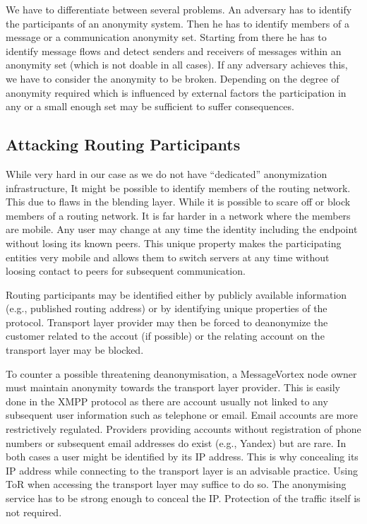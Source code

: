 We have to differentiate between several problems. An adversary has to identify the participants of an anonymity system. Then he has to identify members of a message or a communication anonymity set. Starting from there he has to identify message flows and detect senders and receivers of messages within an anonymity set (which is not doable in all cases). If any adversary achieves this, we have to consider the anonymity to be broken. Depending on the degree of anonymity required which is influenced by external factors the participation in any or a small enough set may be sufficient to suffer consequences.

\subsection{Attacking Routing Participants}
While very hard in our case as we do not have ``dedicated'' anonymization infrastructure, It might be possible to identify members of the routing network. This due to flaws in the blending layer. While it is possible to scare off or block members of a routing network. It is far harder in a network where the members are mobile. Any user may change at any time the identity including the endpoint without losing its known peers. This unique property makes the participating entities very mobile and allows them to switch servers at any time without loosing contact to peers for subsequent communication.

Routing participants may be identified either by publicly available information (e.g., published routing address) or by identifying unique properties of the protocol. Transport layer provider may then be forced to deanonymize the customer related to the accout (if possible) or the relating account on the transport layer may be blocked. 

To counter a possible threatening deanonymisation, a MessageVortex node owner must maintain anonymity towards the transport layer provider. This is easily done in the XMPP protocol as there are account usually not linked to any subsequent user information such as telephone or email. Email accounts are more restrictively regulated. Providers providing accounts without registration of phone numbers or subsequent email addresses do exist (e.g., Yandex) but are rare. In both cases a user might be identified by its IP address. This is why concealing its IP address while connecting to the transport layer is an advisable practice. Using ToR when accessing the transport layer may suffice to do so. The anonymising service has to be strong enough to conceal the IP. Protection of the traffic itself is not required.

